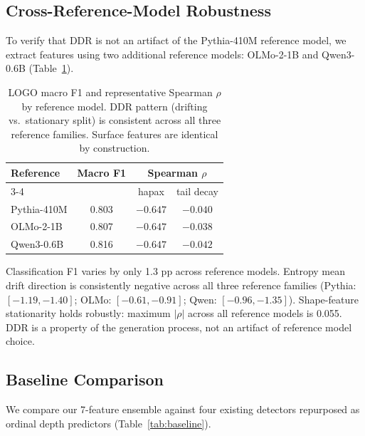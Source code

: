 \documentclass[11pt,twocolumn]{article}
\begin{document}
\subsection{Cross-Reference-Model Robustness}
\label{sec:crossref}

To verify that DDR is not an artifact of the Pythia-410M reference model, we extract features using two additional reference models: OLMo-2-1B and Qwen3-0.6B (Table~\ref{tab:crossref}).

\begin{table}[t]
\centering
\small
\begin{tabular}{lccc}
\toprule
\textbf{Reference} & \textbf{Macro F1} & \multicolumn{2}{c}{\textbf{Spearman $\rho$}} \\
\cmidrule(lr){3-4}
 & & hapax & tail decay \\
\midrule
Pythia-410M & 0.803 & $-0.647$ & $-0.040$ \\
OLMo-2-1B & 0.807 & $-0.647$ & $-0.038$ \\
Qwen3-0.6B & 0.816 & $-0.647$ & $-0.042$ \\
\bottomrule
\end{tabular}
\caption{LOGO macro F1 and representative Spearman $\rho$ by reference model. DDR pattern (drifting vs.\ stationary split) is consistent across all three reference families. Surface features are identical by construction.}
\label{tab:crossref}
\end{table}

Classification F1 varies by only 1.3 pp across reference models.
Entropy mean drift direction is consistently negative across all three reference families (Pythia: $[-1.19, -1.40]$; OLMo: $[-0.61, -0.91]$; Qwen: $[-0.96, -1.35]$).
Shape-feature stationarity holds robustly: maximum $|\rho|$ across all reference models is 0.055.
DDR is a property of the generation process, not an artifact of reference model choice.

\subsection{Baseline Comparison}
\label{sec:baseline}

We compare our 7-feature ensemble against four existing detectors repurposed as ordinal depth predictors (Table~\ref{tab:baseline}).
\end{document}
